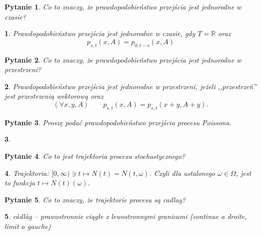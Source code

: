 \documentclass[10pt]{mwart}
\theoremstyle{plain}
\newtheorem{pytanie}{Pytanie}
\theoremstyle{break}
\newtheorem*{odpowiedź}{}
\begin{document}
\begin{pytanie}
Co to znaczy, że prawdopodobieństwo przejścia jest jednorodne w czasie?
\end{pytanie}
\begin{odpowiedź}
    Prawdopodobieństwo przejścia jest jednorodne w czasie,
    gdy $T=\mathbb{R}$ oraz
    \[p_{s, t} (x,A) = p_{0, t-s} (x,A)\]
\end{odpowiedź}


\begin{pytanie}
Co to znaczy, że prawdopodobieństwo przejścia jest jednorodne w przestrzeni?
\end{pytanie}
\begin{odpowiedź}
    Prawdopodobieństwo przejścia jest jednorodne w przestrzeni,
    jeżeli ,,przestrzeń'' jest przestrzenią wektorową oraz \[
        (\forall x, y, A) \qquad p_{s, t}(x, A) = p_{s, t}(x + y, A + y).
    \] 
\end{odpowiedź}


\begin{pytanie}
Proszę podać prawdopodobieństwo przejścia procesu Poissona.
\end{pytanie}
\begin{odpowiedź}
\end{odpowiedź}


\begin{pytanie}
Co to jest trajektoria procesu stochastycznego?
\end{pytanie}
\begin{odpowiedź}
    Trajektoria: $[0, \infty) \ni t \mapsto N(t) = N(t, \omega)$.
    Czyli dla ustalonego $\omega \in \Omega$, jest to funkcja
    $t \mapsto N(t)(\omega)$.
\end{odpowiedź}


\begin{pytanie}
Co to znaczy, że trajektorie procesu są cadlag?
\end{pytanie}
\begin{odpowiedź}
    càdlàg – prawostronnie ciągłe z lewostronnymi granicami
    (continue a droite, limit a gauche)
\end{odpowiedź}
\end{document}
